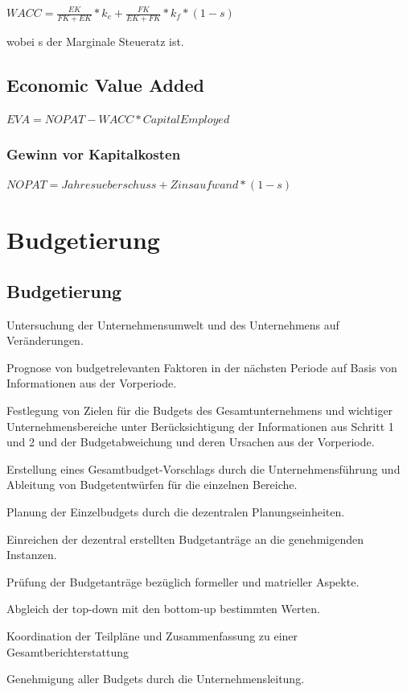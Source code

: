 \documentclass{article}
\begin{document}
$WACC = \frac{EK}{FK + EK} * k_{e} + \frac{FK}{EK + FK} * k_{f} * (1-s)$

wobei s der Marginale Steueratz ist.

\subsection{Economic Value Added}

$EVA =  NOPAT - WACC * CapitalEmployed $

\subsubsection{Gewinn vor Kapitalkosten}

$NOPAT = Jahresueberschuss + Zinsaufwand * (1 - s)$


\section{Budgetierung}

\subsection{Budgetierung}
\begin{center}
\item Untersuchung der Unternehmensumwelt und des Unternehmens auf
Veränderungen.
\item Prognose von budgetrelevanten Faktoren in der nächsten Periode auf Basis
von Informationen aus der Vorperiode.
\item Festlegung von Zielen für die Budgets des Gesamtunternehmens und
wichtiger Unternehmensbereiche unter Berücksichtigung der Informationen
aus Schritt 1 und 2 und der Budgetabweichung und deren Ursachen aus der
Vorperiode.
\item Erstellung eines Gesamtbudget-Vorschlags durch die Unternehmensführung
und Ableitung von Budgetentwürfen für die einzelnen Bereiche.
\item Planung der Einzelbudgets durch die dezentralen Planungseinheiten.
\item Einreichen der dezentral erstellten Budgetanträge an die genehmigenden
Instanzen. 
\item Prüfung der Budgetanträge bezüglich formeller und matrieller Aspekte.
\item Abgleich der top-down mit den bottom-up bestimmten Werten.
\item Koordination der Teilpläne und Zusammenfassung zu einer Gesamtberichterstattung
\item Genehmigung aller Budgets durch die Unternehmensleitung.

\end{center}
\end{document}
